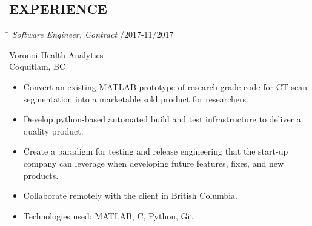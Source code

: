 \documentclass{res}
\begin{document}
\begin{resume}
\section{EXPERIENCE}
    \vspace{-0.1in}
    \begin{tabbing}
    \hspace{5.15in}\= \kill  %
    \textit{Software Engineer, Contract} /2017-11/2017
    \end{tabbing}\vspace{-22pt}  %
    Voronoi Health Analytics\\
    Coquitlam, BC\\
    \vspace{-1.5ex}\begin{itemize}[noitemsep]
    \item Convert an existing MATLAB prototype of research-grade code for CT-scan segmentation into a marketable sold product for researchers.
    \item Develop python-based automated build and test infrastructure to deliver a quality product.
    \item Create a paradigm for testing and release engineering that the start-up company can leverage when developing future features, fixes, and new products.
    \item Collaborate remotely with the client in British Columbia.
    \item Technologies used: MATLAB, C, Python, Git.
    \end{itemize}


\end{resume}
\end{document}
